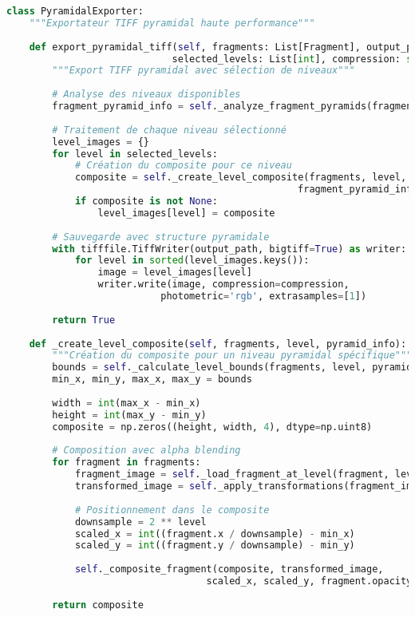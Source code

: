 \documentclass[12pt,a4paper]{report}
\begin{document}
\begin{lstlisting}[language=Python, caption=Exportation pyramidale optimisée]
class PyramidalExporter:
    """Exportateur TIFF pyramidal haute performance"""
    
    def export_pyramidal_tiff(self, fragments: List[Fragment], output_path: str,
                             selected_levels: List[int], compression: str = "LZW"):
        """Export TIFF pyramidal avec sélection de niveaux"""
        
        # Analyse des niveaux disponibles
        fragment_pyramid_info = self._analyze_fragment_pyramids(fragments)
        
        # Traitement de chaque niveau sélectionné
        level_images = {}
        for level in selected_levels:
            # Création du composite pour ce niveau
            composite = self._create_level_composite(fragments, level, 
                                                   fragment_pyramid_info)
            if composite is not None:
                level_images[level] = composite
        
        # Sauvegarde avec structure pyramidale
        with tifffile.TiffWriter(output_path, bigtiff=True) as writer:
            for level in sorted(level_images.keys()):
                image = level_images[level]
                writer.write(image, compression=compression, 
                           photometric='rgb', extrasamples=[1])
        
        return True
    
    def _create_level_composite(self, fragments, level, pyramid_info):
        """Création du composite pour un niveau pyramidal spécifique"""
        bounds = self._calculate_level_bounds(fragments, level, pyramid_info)
        min_x, min_y, max_x, max_y = bounds
        
        width = int(max_x - min_x)
        height = int(max_y - min_y)
        composite = np.zeros((height, width, 4), dtype=np.uint8)
        
        # Composition avec alpha blending
        for fragment in fragments:
            fragment_image = self._load_fragment_at_level(fragment, level, pyramid_info)
            transformed_image = self._apply_transformations(fragment_image, fragment)
            
            # Positionnement dans le composite
            downsample = 2 ** level
            scaled_x = int((fragment.x / downsample) - min_x)
            scaled_y = int((fragment.y / downsample) - min_y)
            
            self._composite_fragment(composite, transformed_image, 
                                   scaled_x, scaled_y, fragment.opacity)
        
        return composite
\end{lstlisting}
\end{document}
